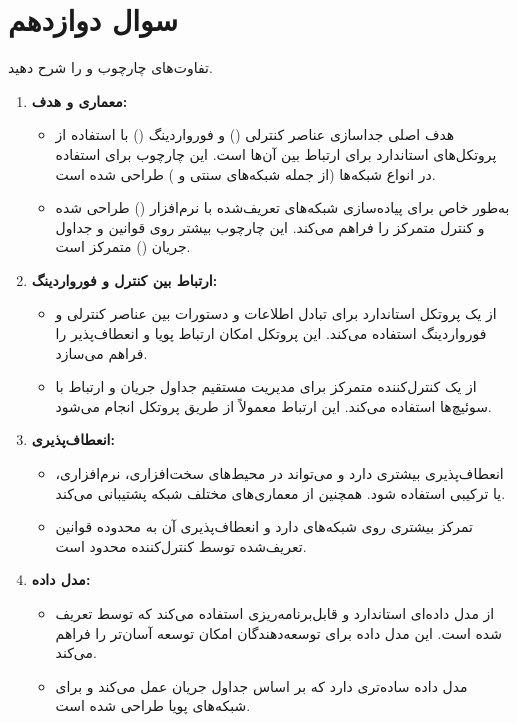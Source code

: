 \section{سوال دوازدهم}

تفاوت‌های چارچوب  و  را شرح دهید.

\begin{qsolve}
	\begin{enumerate}
		\item \textbf{معماری و هدف:}
		\begin{itemize}
			\item {} هدف اصلی  جداسازی عناصر کنترلی () و فورواردینگ () با استفاده از پروتکل‌های استاندارد برای ارتباط بین آن‌ها است. این چارچوب برای استفاده در انواع شبکه‌ها (از جمله شبکه‌های سنتی و ) طراحی شده است.
			\item {} به‌طور خاص برای پیاده‌سازی شبکه‌های تعریف‌شده با نرم‌افزار () طراحی شده و کنترل متمرکز را فراهم می‌کند. این چارچوب بیشتر روی قوانین و جداول جریان () متمرکز است.
		\end{itemize}
		
		\item \textbf{ارتباط بین کنترل و فورواردینگ:}
		\begin{itemize}
			\item {} از یک پروتکل استاندارد برای تبادل اطلاعات و دستورات بین عناصر کنترلی و فورواردینگ استفاده می‌کند. این پروتکل امکان ارتباط پویا و انعطاف‌پذیر را فراهم می‌سازد.
			\item {} از یک کنترل‌کننده متمرکز برای مدیریت مستقیم جداول جریان و ارتباط با سوئیچ‌ها استفاده می‌کند. این ارتباط معمولاً از طریق پروتکل  انجام می‌شود.
		\end{itemize}
		
		\item \textbf{انعطاف‌پذیری:}
		\begin{itemize}
			\item {} انعطاف‌پذیری بیشتری دارد و می‌تواند در محیط‌های سخت‌افزاری، نرم‌افزاری، یا ترکیبی استفاده شود. همچنین از معماری‌های مختلف شبکه پشتیبانی می‌کند.
			\item {} تمرکز بیشتری روی شبکه‌های  دارد و انعطاف‌پذیری آن به محدوده قوانین تعریف‌شده توسط کنترل‌کننده محدود است.
		\end{itemize}
		
		\item \textbf{مدل داده:}
		\begin{itemize}
			\item {} از مدل داده‌ای استاندارد و قابل‌برنامه‌ریزی استفاده می‌کند که توسط  تعریف شده است. این مدل داده برای توسعه‌دهندگان امکان توسعه آسان‌تر را فراهم می‌کند.
			\item {} مدل داده ساده‌تری دارد که بر اساس جداول جریان عمل می‌کند و برای شبکه‌های پویا طراحی شده است.
		\end{itemize}
		

\end{enumerate}
\end{qsolve}
